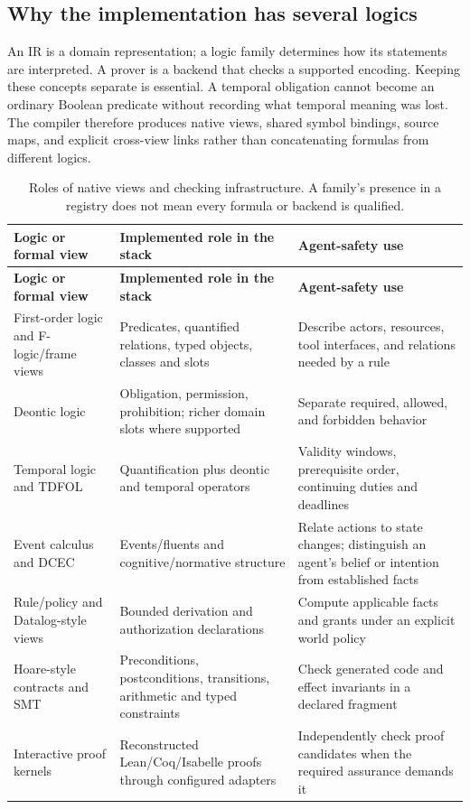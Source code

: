 \documentclass{article}
\begin{document}
\subsection{Why the implementation has several logics}

An IR is a domain representation; a logic family determines how its statements are interpreted. A prover is a backend that checks a supported encoding. Keeping these concepts separate is essential. A temporal obligation cannot become an ordinary Boolean predicate without recording what temporal meaning was lost. The compiler therefore produces native views, shared symbol bindings, source maps, and explicit cross-view links rather than concatenating formulas from different logics.
\begingroup
\renewcommand{\thetable}{2}
\begin{longtable}{@{}>{\raggedright\arraybackslash}p{.24\linewidth} >{\raggedright\arraybackslash}p{.32\linewidth} >{\raggedright\arraybackslash}p{.38\linewidth}@{}}
\caption{Roles of native views and checking infrastructure. A family's presence in a registry does not mean every formula or backend is qualified.}\label{tab:2}\\
\toprule
\textbf{Logic or formal view} & \textbf{Implemented role in the stack} & \textbf{Agent-safety use} \\
\midrule
\endfirsthead
\textbf{Logic or formal view} & \textbf{Implemented role in the stack} & \textbf{Agent-safety use} \\
\midrule
\endhead
\bottomrule
\endlastfoot
First-order logic and F-logic/frame views & Predicates, quantified relations, typed objects, classes and slots & Describe actors, resources, tool interfaces, and relations needed by a rule \\[3pt]
Deontic logic & Obligation, permission, prohibition; richer domain slots where supported & Separate required, allowed, and forbidden behavior \\[3pt]
Temporal logic and TDFOL & Quantification plus deontic and temporal operators & Validity windows, prerequisite order, continuing duties and deadlines \\[3pt]
Event calculus and DCEC & Events/fluents and cognitive/normative structure & Relate actions to state changes; distinguish an agent's belief or intention from established facts \\[3pt]
Rule/policy and Datalog-style views & Bounded derivation and authorization declarations & Compute applicable facts and grants under an explicit world policy \\[3pt]
Hoare-style contracts and SMT & Preconditions, postconditions, transitions, arithmetic and typed constraints & Check generated code and effect invariants in a declared fragment \\[3pt]
Interactive proof kernels & Reconstructed Lean/Coq/Isabelle proofs through configured adapters & Independently check proof candidates when the required assurance demands it \\[3pt]
\end{longtable}
\endgroup
\end{document}
